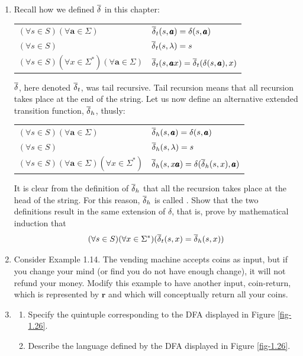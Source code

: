 \begin{enumerate}[{1.}1.]
\item Recall how we defined $\overline{\delta}$ in this chapter:
\begin{center}\begin{tabular}{l@{$\qquad$}l}
$(\forall s\in S)(\forall\pmb{a}\in \Sigma)$ & $\overline{\delta}_t(s,\pmb{a})=\delta(s,
	\pmb{a})$ \\
$(\forall s\in S)$ & $\overline{\delta}_t(s,\lambda)=s$ \\
$(\forall s\in S)(\forall x\in\Sigma^*)(\forall\pmb{a}\in\Sigma)$ & $\overline{\delta}_t
	(s,\pmb{a}x)=\overline{\delta}_t(\delta(s,\pmb{a}),x)$
\end{tabular}\end{center}
$\overline{\delta}$, here denoted $\overline{\delta}_t$, was tail recursive. Tail recursion means that
all recursion takes place at the end of the string. Let us now define an
alternative extended transition function, $\overline{\delta}_h$, thusly:
\begin{center}\begin{tabular}{l@{$\qquad$}l}
$(\forall s\in S)(\forall\pmb{a}\in\Sigma)$ & $\overline{\delta}_h(s,\pmb{a})=\delta(s,
	\pmb{a})$ \\
$(\forall s\in S)$ & $\overline{\delta}_h(s,\lambda)=s$ \\
$(\forall s\in S)(\forall\pmb{a}\in\Sigma)(\forall x\in\Sigma^*)$ & $\overline{\delta}_h
	(s,x\pmb{a})=\delta(\overline{\delta}_h(s,x),\pmb{a})$
\end{tabular}\end{center}
It is clear from the definition of $\overline{\delta}_h$ that all the recursion
takes place at the head of the string. For this reason, $\overline{\delta}_h$ is
called \emph{}. Show that the two definitions result in
the same extension of $\delta$, that is, prove by mathematical induction that
\[ (\forall s\in S)(\forall x\in\Sigma^*)(\overline{\delta}_t(s,x)=\overline{\delta}_h(s,x)) \]

\item Consider Example 1.14. The vending machine accepts coins as input, but if
you change your mind (or find you do not have enough change), it will not
refund your money. Modify this example to have another input, \<coin-return\>,
which is represented by $\pmb{r}$ and which will conceptually return all your
coins.

\item\label{exer1.3}
\begin{enumerate}
  \item Specify the quintuple corresponding to the DFA displayed in Figure \ref{fig-1.26}.
  \item Describe the language defined by the DFA displayed in Figure \ref{fig-1.26}.
\end{enumerate}


\end{enumerate}
